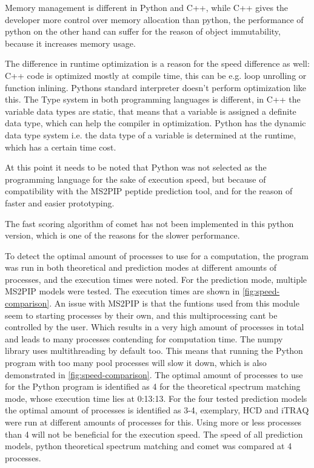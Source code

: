\documentclass[11pt]{article}
\begin{document}
Memory management is different in Python and C++, while C++ gives the developer more control over memory allocation than python, the performance of python on the other hand can suffer for the reason of object immutability, because it increases memory usage. 

The difference in runtime optimization is a reason for the speed difference as well: C++ code is optimized mostly at compile time, this can be e.g. loop unrolling or function inlining. Pythons standard interpreter doesn't perform optimization like this. The Type system in both programming languages is different, in C++ the variable data types are static, that means that a variable is assigned a definite data type, which can help the compiler in optimization. Python has the dynamic data type system i.e. the data type of a variable is determined at the runtime, which has a certain time cost.

At this point it needs to be noted that Python was not selected as the programming language for the sake of execution speed, but because of compatibility with the MS2PIP peptide prediction tool, and for the reason of faster and easier prototyping.

The fast scoring algorithm of comet has not been implemented in this python version, which is one of the reasons for the slower performance.

To detect the optimal amount of processes to use for a computation, the program was run in both theoretical and prediction modes at different amounts of processes, and the execution times were noted. For the prediction mode, multiple MS2PIP models were tested. The execution times are shown in \cref{fig:speed-comparison}. An issue with MS2PIP is that the funtions used from this module seem to starting processes by their own, and this multiprocessing cant be controlled by the user. Which results in a very high amount of processes in total and leads to many processes contending for computation time. The numpy library uses multithreading by default too. This means that running the Python program with too many pool processes will slow it down, which is also demonstrated in \cref{fig:speed-comparison}. The optimal amount of processes to use for the Python program is identified as 4 for the theoretical spectrum matching mode, whose execution time lies at 0:13:13. For the four tested prediction models the optimal amount of processes is identified as 3-4, exemplary, HCD and iTRAQ were run at different amounts of processes for this. Using more or less processes than 4 will not be beneficial for the execution speed. The speed of all prediction models, python theoretical spectrum matching and comet was compared at 4 processes.
\end{document}

